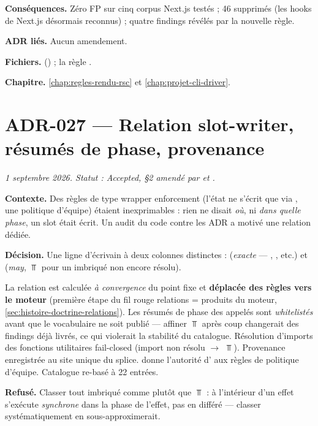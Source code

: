 \textbf{Conséquences.} Zéro FP sur cinq corpus Next.js testés ; 46 \Info{}
 supprimés (les hooks de Next.js désormais reconnus) ;
quatre findings révélés par la nouvelle règle.

\textbf{ADR liés.} Aucun amendement.

\textbf{Fichiers.}  () ;
la règle .

\textbf{Chapitre.} \cref{chap:regles-rendu-rsc} et \cref{chap:projet-cli-driver}.

\section{ADR-027 --- Relation slot-writer, résumés de phase, provenance}
\label{adr:27}
\noindent\textit{1{\ier} septembre 2026. Statut : Accepted, §2 amendé par  et .}

\textbf{Contexte.} Des règles de type \og wrapper enforcement\fg{}
(\og l'état ne s'écrit que via \fg{}, une politique d'équipe)
étaient inexprimables : rien ne disait \emph{où}, ni \emph{dans quelle
phase}, un slot était écrit. Un audit du code contre les ADR a motivé une
relation dédiée.

\textbf{Décision.} Une ligne d'écrivain à deux colonnes distinctes :
 (\emph{exacte} --- , , etc.) et
 (\emph{may}, $\Top$ pour un  imbriqué non encore
résolu).


La relation est calculée \emph{à convergence} du point fixe et
\textbf{déplacée des règles vers le moteur} (première étape du fil rouge
\og relations = produits du moteur\fg{}, \cref{sec:histoire-doctrine-relations}).
Les résumés de phase des appelés sont \emph{whitelistés} avant que le
vocabulaire ne soit publié --- affiner $\Top$ après coup changerait des
findings déjà livrés, ce qui violerait la stabilité du catalogue. Résolution
d'imports des fonctions utilitaires \og fail-closed\fg{} (import non résolu
$\to$ $\Top$). Provenance enregistrée au site unique du splice.
 donne l'autorité d'\Error{} aux règles de politique
d'équipe. Catalogue re-basé à 22 entrées.

\textbf{Refusé.} Classer tout  imbriqué comme 
plutôt que $\Top$ :  à l'intérieur d'un effet
s'exécute \emph{synchrone} dans la phase de l'effet, pas \og en différé\fg{} ---
classer systématiquement en  sous-approximerait.


